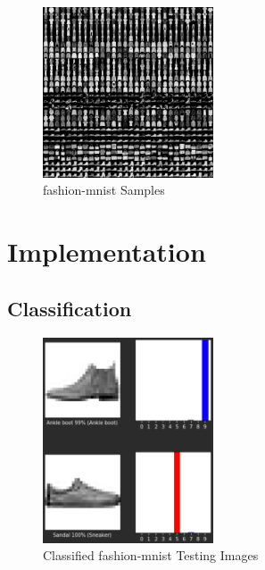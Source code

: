 \documentclass[conference]{IEEEtran}
\begin{document}
    \begin{figure}
        \caption{fashion-mnist Samples}
        \label{fig:fashion-mnist}
        \begin{center}
            \includegraphics[width=0.45\textwidth]{data.png}
        \end{center}
    \end{figure}

    \section{Implementation}\label{sec:implementation}

    \subsection{Classification}\label{subsec:implementation-classification}

    \begin{figure}
        \caption{Classified fashion-mnist Testing Images}
        \label{fig:classification}
        \begin{center}
            \includegraphics[width=0.45\textwidth]{classification.png}
        \end{center}
    \end{figure}
\end{document}
